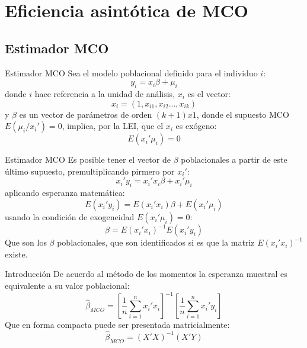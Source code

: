 \section{Eficiencia asintótica de MCO}

\subsection{Estimador MCO}
\begin{frame}[fragile]{Estimador MCO}
	Sea el modelo poblacional definido para el individuo $i$: 
		$$y_i=x_i\beta+\mu_i$$
	donde $i$ hace referencia a la unidad de análisis, $x_i$ es el vector:
		$$x_i=(1, x_{i1},x_{i2}...,x_{ik})$$
	y $\beta$ es un vector de parámetros de orden $(k+1)x1$, donde el supuesto MCO $E(\mu_i/x_i' )=0$, implica, por la LEI, que el $x_i$ es exógeno:
		$$E(x_i'  \mu_i )=0$$
\end{frame}

\begin{frame}{Estimador MCO}
	Es posible tener el vector de $\beta$ poblacionales a partir de este último supuesto, premultiplicando pirmero por $x_i'$:
		$$x_i' y_i=x_i' x_i\beta+x_i'\mu_i$$
	aplicando esperanza matemática:
		$$E(x_i' y_i)=E(x_i' x_i)\beta+E(x_i'\mu_i)$$
	usando la condición de exogeneidad $E(x_i'\mu_i)=0$:
		$$\beta=E(x_i' x_i)^{-1}E(x_i' y_i)$$
	Que son los $\beta$ poblacionales, que son identificados si es que la matriz $E(x_i' x_i)^{-1}$ existe.
\end{frame}

\begin{frame}{Introducción}
	De acuerdo al método de los momentos la esperanza muestral es equivalente a su valor poblacional:
		$$\hat\beta_{MCO}=\left[\frac{1}{n}\sum_{i=1}^n x_i' x_i\right]^{-1} \left[\frac{1}{n}\sum_{i=1}^n  x_i' y_i\right]$$
	Que en forma compacta puede ser presentada matricialmente:
		$$\hat\beta_{MCO}=(X'X)^{-1}(X'Y)$$
\end{frame}

